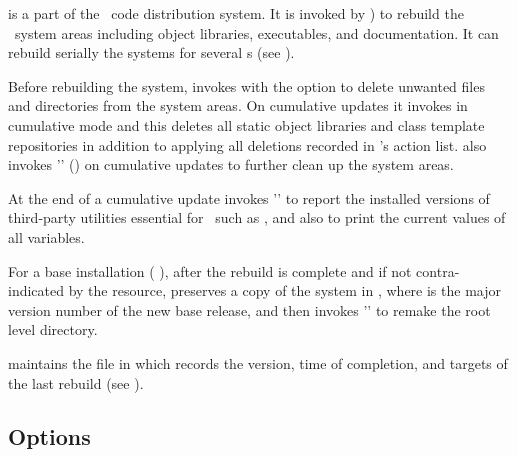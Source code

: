  is a part of the \aipspp\ code distribution system.  It is
invoked by ) to rebuild the \aipspp\ system areas
including object libraries, executables, and documentation.  It can rebuild
serially the systems for several s (see ).

Before rebuilding the system,  invokes 
with the  option to delete unwanted files and directories from
the system areas.  On cumulative updates it invokes 
in cumulative mode and this deletes all static object libraries and class
template repositories in addition to applying all deletions recorded in
's action list.   also invokes
'' () on cumulative updates
to further clean up the system areas.

At the end of a cumulative update  invokes
'' to report the installed
versions of third-party utilities essential for \aipspp\ such as
, and also to print the current values of all 
variables.

For a base installation ( ), after the rebuild is complete
and if not contra-indicated by the 
resource,  preserves a copy of the system in
, where  is the major version number of
the new base release, and then invokes
'' to remake
the root level directory.

 maintains the  file in  which
records the version, time of completion, and  targets of the
last rebuild (see ).

\subsection*{Options}

